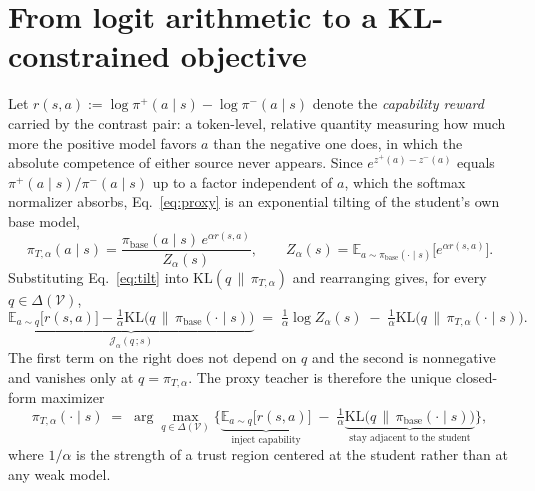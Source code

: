 \documentclass{article}
\begin{document}
\section{From logit arithmetic to a KL-constrained objective}
\label{sec: justification}
Let $r(s,a):=\log\pi^{+}(a\mid s)-\log\pi^{-}(a\mid s)$ denote the \emph{capability
reward} carried by the contrast pair: a token-level, relative quantity measuring how
much more the positive model favors $a$ than the negative one does, in which the
absolute competence of either source never appears. Since $e^{z^{+}(a)-z^{-}(a)}$
equals $\pi^{+}(a\mid s)/\pi^{-}(a\mid s)$ up to a factor independent of $a$, which
the softmax normalizer absorbs, Eq.~\ref{eq:proxy} is an exponential tilting of the
student's own base model,
\begin{equation}
  \pi_{T,\alpha}(a\mid s)=\frac{\pi_{\mathrm{base}}(a\mid s)\,e^{\alpha r(s,a)}}{Z_{\alpha}(s)},
  \qquad
  Z_{\alpha}(s)=\mathbb{E}_{a\sim\pi_{\mathrm{base}}(\cdot\mid s)}\big[e^{\alpha r(s,a)}\big].
  \label{eq:tilt}
\end{equation}
Substituting Eq.~\ref{eq:tilt} into $\mathrm{KL}(q\,\|\,\pi_{T,\alpha})$ and
rearranging gives, for every $q\in\Delta(\mathcal{V})$,
\begin{equation}
  \underbrace{\mathbb{E}_{a\sim q}\big[r(s,a)\big]
  -\tfrac{1}{\alpha}\mathrm{KL}\big(q\,\|\,\pi_{\mathrm{base}}(\cdot\mid s)\big)}_{\textstyle \mathcal{J}_{\alpha}(q\,;s)}
  \;=\;\tfrac{1}{\alpha}\log Z_{\alpha}(s)\;-\;\tfrac{1}{\alpha}\mathrm{KL}\big(q\,\|\,\pi_{T,\alpha}(\cdot\mid s)\big).
  \label{eq:variational}
\end{equation}
The first term on the right does not depend on $q$ and the second is nonnegative and
vanishes only at $q=\pi_{T,\alpha}$. The proxy teacher is therefore the unique
closed-form maximizer
\begin{equation}
  \pi_{T,\alpha}(\cdot\mid s)\;=\;\arg\max_{q\in\Delta(\mathcal{V})}
  \Big\{\underbrace{\mathbb{E}_{a\sim q}\big[r(s,a)\big]}_{\text{inject capability}}
  \;-\;\tfrac{1}{\alpha}\underbrace{\mathrm{KL}\big(q\,\|\,\pi_{\mathrm{base}}(\cdot\mid s)\big)}_{\text{stay adjacent to the student}}\Big\},
  \label{eq:argmax}
\end{equation}
where $1/\alpha$ is the strength of a trust region centered at
the student rather than at any weak model.
\end{document}
